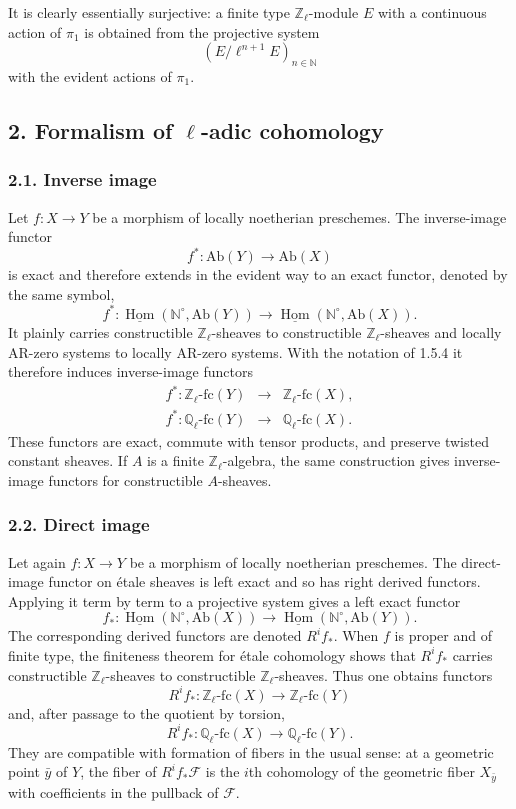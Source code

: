 \documentclass[12pt]{article}
\newcommand{\bZ}{\mathbb Z}
\newcommand{\bQ}{\mathbb Q}
\newcommand{\bN}{\mathbb N}
\newcommand{\cF}{\mathcal F}
\newcommand{\Hom}{\operatorname{Hom}}
\newcommand{\fc}{\mathrm{fc}}
\begin{document}
It is clearly essentially surjective: a finite type $\bZ_\ell$-module $E$ with a
continuous action of $\pi_1$ is obtained from the projective system
\[
       (E/\ell^{n+1}E)_{n\in\bN}
\]
with the evident actions of $\pi_1$.


\subsection*{2. Formalism of $\ell$-adic cohomology}

\subsubsection*{2.1. Inverse image}

Let $f:X\to Y$ be a morphism of locally noetherian preschemes. The inverse-image
functor
\[
      f^*:\mathrm{Ab}(Y)\longrightarrow \mathrm{Ab}(X)
\]
is exact and therefore extends in the evident way to an exact functor, denoted by the
same symbol,
\[
      f^*:\underline{\Hom}(\bN^\circ,\mathrm{Ab}(Y))
      \longrightarrow\underline{\Hom}(\bN^\circ,\mathrm{Ab}(X)).
\]
It plainly carries constructible $\bZ_\ell$-sheaves to constructible
$\bZ_\ell$-sheaves and locally AR-zero systems to locally AR-zero systems. With the
notation of 1.5.4 it therefore induces inverse-image functors
\[
\begin{array}{rcl}
 f^*:\bZ_\ell\text{-}\fc(Y)&\longrightarrow&\bZ_\ell\text{-}\fc(X),\\[3pt]
 f^*:\bQ_\ell\text{-}\fc(Y)&\longrightarrow&\bQ_\ell\text{-}\fc(X).
\end{array}
\]
These functors are exact, commute with tensor products, and preserve twisted
constant sheaves. If $A$ is a finite $\bZ_\ell$-algebra, the same construction gives
inverse-image functors for constructible $A$-sheaves.

\subsubsection*{2.2. Direct image}

Let again $f:X\to Y$ be a morphism of locally noetherian preschemes. The direct-image
functor on étale sheaves is left exact and so has right derived functors. Applying it
term by term to a projective system gives a left exact functor
\[
      f_*:\underline{\Hom}(\bN^\circ,\mathrm{Ab}(X))
      \longrightarrow\underline{\Hom}(\bN^\circ,\mathrm{Ab}(Y)).
\]
The corresponding derived functors are denoted $R^if_*$. When $f$ is proper and of
finite type, the finiteness theorem for étale cohomology shows that $R^if_*$ carries
constructible $\bZ_\ell$-sheaves to constructible $\bZ_\ell$-sheaves. Thus one obtains
functors
\[
      R^if_*:\bZ_\ell\text{-}\fc(X)\longrightarrow \bZ_\ell\text{-}\fc(Y)
\]
and, after passage to the quotient by torsion,
\[
      R^if_*:\bQ_\ell\text{-}\fc(X)\longrightarrow \bQ_\ell\text{-}\fc(Y).
\]
They are compatible with formation of fibers in the usual sense: at a geometric point
$\bar y$ of $Y$, the fiber of $R^if_*\cF$ is the $i$th cohomology of the geometric
fiber $X_{\bar y}$ with coefficients in the pullback of $\cF$.
\end{document}

